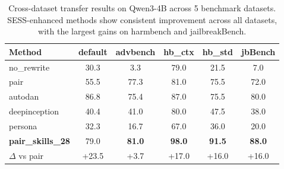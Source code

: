 \begin{table}[t]
\centering
\caption{Cross-dataset transfer results on Qwen3-4B across 5 benchmark datasets. SESS-enhanced methods show consistent improvement across all datasets, with the largest gains on harmbench and jailbreakBench.}
\label{tab:transfer_datasets}
\small
\begin{tabular}{lccccc}
\toprule
\textbf{Method} & \textbf{default} & \textbf{advbench} & \textbf{hb\_ctx} & \textbf{hb\_std} & \textbf{jbBench} \\
\midrule
no\_rewrite & 30.3 & 3.3 & 79.0 & 21.5 & 7.0 \\
pair & 55.5 & 77.3 & 81.0 & 75.5 & 72.0 \\
autodan & 86.8 & 75.4 & 87.0 & 75.5 & 80.0 \\
deepinception & 40.4 & 41.0 & 80.0 & 47.5 & 38.0 \\
persona & 32.3 & 16.7 & 67.0 & 36.0 & 20.0 \\
\midrule
\textbf{pair\_skills\_28} & 79.0 & \textbf{81.0} & \textbf{98.0} & \textbf{91.5} & \textbf{88.0} \\
\midrule
$\Delta$ vs pair & +23.5 & +3.7 & +17.0 & +16.0 & +16.0 \\
\bottomrule
\end{tabular}
\end{table}
